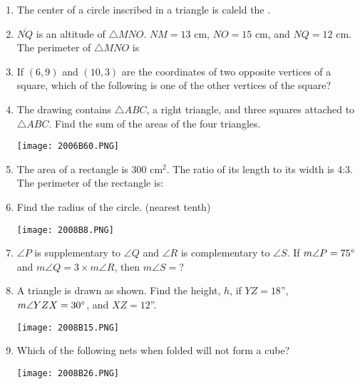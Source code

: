 \documentclass[../uilmath.tex]{subfiles}
\begin{document}
\begin{enumerate}[label=\bfseries\arabic*.]
    \item %
    The center of a circle inscribed in a triangle is caleld the \blank.

    \item %
    $\overline{NQ}$ is an altitude of $\triangle MNO$. $NM = 13$ cm, $NO = 15$ cm, and $NQ = 12$ cm. The perimeter of $\triangle MNO$ is 

    \item %
    If $(6,9)$ and $(10,3)$ are the coordinates of two opposite vertices of a square, which of the following is one of the other vertices of the square?

    \item %
    The drawing contains $\triangle ABC$, a right triangle, and three squares attached to 
    $\triangle ABC$. Find the sum of the areas of the four triangles.
    \begin{center}
        \texttt{[image: 2006B60.PNG]}
    \end{center}

    \item %
    The area of a rectangle is 300 cm$^2$. The ratio of its length to its width is 4:3. The perimeter of the rectangle is: 

    \item %
    Find the radius of the circle. (nearest tenth)

    \begin{center}
        \texttt{[image: 2008B8.PNG]}
    \end{center}

    \item %
    $\angle P$ is supplementary to $\angle Q$ and $\angle R$ is complementary to $\angle S$. If $m\angle P=75\degree$ and 
    $m\angle Q=3\times m\angle R$, then $m\angle S=$?

    \item %
    A triangle is drawn as shown. Find the height, $h$, if $YZ=18$'', $m\angle YZX = 30\degree$, and $XZ=12$''.
    \begin{center}
        \texttt{[image: 2008B15.PNG]}
    \end{center}

    \item %
    Which of the following nets when folded will not form a cube?
    \begin{center}
        \texttt{[image: 2008B26.PNG]}
    \end{center}


\end{enumerate}
\end{document}
